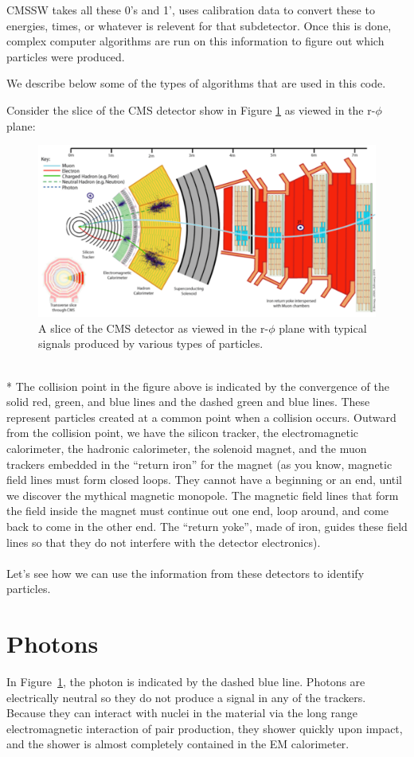 CMSSW takes all these 0's and 1', uses calibration data to convert these to energies, times, or whatever is relevent for that subdetector. Once this is done,   complex computer algorithms are run on this information to figure out which particles were produced.  

We describe below some of the types of algorithms that are used in this code.


Consider the slice of the CMS detector show in Figure \ref{fig:pid1} as viewed in the r-$\phi$ plane: 
\begin{figure}[h]
\centering\includegraphics[scale=0.6]{./particleID/Pictures/fig1.pdf}
\caption{A slice of the CMS detector as viewed in the r-$\phi$ plane with typical signals produced by various types of particles.}
\label{fig:pid1}
\end{figure} 
\\*
The collision point in the figure above is indicated by the convergence of the solid red, green, and blue lines and the dashed green and blue lines. These represent particles created at a common point when a collision occurs. Outward from the collision point, we have the silicon tracker, the electromagnetic calorimeter, the hadronic calorimeter, the solenoid magnet, and the muon trackers embedded in the ``return iron'' for the magnet (as you know, magnetic field lines must form closed loops. They cannot have a beginning or an end, until we discover the mythical magnetic monopole. The magnetic field lines that form the field inside the magnet must continue out one end, loop around, and come back to come in the other end. The ``return yoke'', made of iron, guides these field lines so that they do not interfere with the detector electronics).  
\\
\\
\noindent
Let's see how we can use the information from these detectors to identify particles.
\section{Photons}
In Figure~\ref{fig:pid1}, the photon is indicated by the dashed blue line.  Photons are electrically neutral so they do not produce a signal in any of the trackers. Because they can interact with nuclei in the material via the long range electromagnetic interaction of pair production, they shower quickly upon impact, and the shower is almost completely contained in the EM calorimeter.
